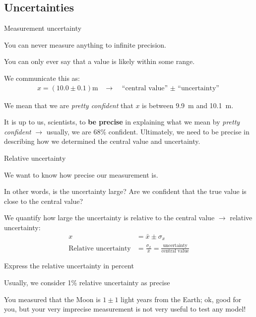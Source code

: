 \documentclass[aspectratio=169,
hyperref={colorlinks,urlcolor=blue}
]{beamer}
\begin{document}
\subsection{Uncertainties}
\label{subsec:measurementuncertainty}
\begin{bulletframe}{Measurement uncertainty}
\item You can never measure anything to infinite precision.
\item You can only ever say that a value is likely within some range.
\item We communicate this as:
\begin{eqnarray}
x = (10.0\pm 0.1)\text{m}\;\;\; \rightarrow\;\;\;\text{``central value'' $\pm$ ``uncertainty''}
\end{eqnarray}
\item We mean that we are \emph{pretty confident} that $x$ is between \SI{9.9}{m} and \SI{10.1}{m}.
\item It is up to us, scientists, to \textbf{be precise} in explaining what we mean by \emph{pretty confident} $\rightarrow$ usually, we are 68\% confident. Ultimately, we need to be precise in describing how we determined the central value and uncertainty.
\end{bulletframe}


\begin{bulletframe}{Relative uncertainty}
\item We want to know how precise our measurement is.
\item In other words, is the uncertainty large? Are we confident that the true value is close to the central value?
\item We quantify how large the uncertainty is relative to the central value $\rightarrow$ relative uncertainty:
\begin{align*}
x &=\bar x \pm \sigma_x\\
\text{Relative uncertainty} &=\frac {\sigma_x}{\bar x}=\frac{\text{uncertainty}}{\text{central value}}
\end{align*}
\item Express the relative uncertainty in percent
\item Usually, we consider 1\% relative uncertainty as precise
\item You measured that the Moon is $1\pm 1$ light years from the Earth; ok, good for you, but your very imprecise measurement is not very useful to test any model!
\end{bulletframe}
\end{document}

